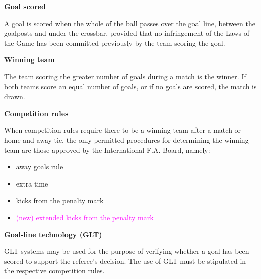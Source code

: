 \clearpage
\sffamily
{\bfseries\color[rgb]{0.4,0.4,0.4}{Law 10 -- The Method of Scoring} }
{}

\bigskip

{\bfseries Goal scored }

\headlinebox

A goal is scored when the whole of the ball passes over the goal line, between the goalposts and under the crossbar, provided that no infringement of the Laws of the Game has been committed previously by the team scoring the goal.

\bigskip

{\bfseries Winning team}

\headlinebox

The team scoring the greater number of goals during a match is the winner. If both teams score an equal number of goals, or if no goals are scored, the match is drawn. 

\bigskip

{\bfseries Competition rules }

\headlinebox

When competition rules require there to be a winning team after a match or home-and-away tie, the only permitted procedures for determining the winning team are those approved by the International F.A. Board, namely:

\begin{itemize}
\item away goals rule
\item extra time
\item kicks from the penalty mark
\item \textcolor{magenta}{(new) extended kicks from the penalty mark}
\end{itemize}


{\bfseries Goal-line technology (GLT) }

\headlinebox

GLT systems may be used for the purpose of verifying whether a goal has been scored to support the referee{\textquoteright}s decision. The use of GLT must be stipulated in the respective competition rules.